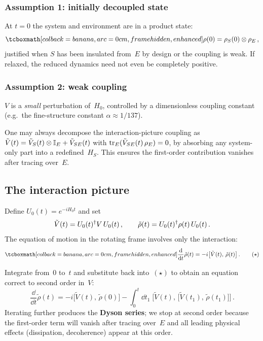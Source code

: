 \subsubsection{Assumption 1: initially decoupled state}

At $t=0$ the system and environment are in a product state:
\begin{equation}\label{eq:product-init}
  \eqbox{\rho(0) = \rho_S(0) \tp \rho_E}\,,
\end{equation}
justified when $S$ has been insulated from~$E$ by design or the
coupling is weak.  If relaxed, the reduced dynamics need not even be
completely positive.

\subsubsection{Assumption 2: weak coupling}

$V$ is a \emph{small} perturbation of~$H_0$, controlled by a
dimensionless coupling constant (e.g.\ the fine-structure constant
$\alpha\approx 1/137$).

\begin{remark}
  One may always decompose the interaction-picture coupling as
  $\tilde{V}(t) = \tilde{V}_S(t)\otimes\mathbb{I}_E + \tilde{V}_{SE}(t)$
  with $\operatorname{tr}_E(\tilde{V}_{SE}(t)\,\rho_E)=0$, by absorbing any
  system-only part into a redefined~$H_S$.  This ensures the
  first-order contribution vanishes after tracing over~$E$.
\end{remark}

\subsection{The interaction picture}%
\label{sec:interaction-picture}

Define $U_0(t)=e^{-iH_0 t}$ and set
\begin{equation}\label{eq:int-picture}
  \tilde{V}(t) = U_0(t)^\dagger V\, U_0(t)\,,\qquad
  \tilde{\rho}(t) = U_0(t)^\dagger\rho(t)\, U_0(t)\,.
\end{equation}
The equation of motion in the rotating frame involves only the
interaction:
\begin{equation}\label{eq:von-neumann-int}
  \eqbox{\frac{\dd}{\dd t}\tilde{\rho}(t)
  = -i\bigl[\tilde{V}(t),\,\tilde{\rho}(t)\bigr]}\,.
  \tag{$\star$}
\end{equation}

Integrate from~$0$ to~$t$ and substitute back into~$(\star)$ to
obtain an equation correct to second order in~$V$:
\begin{equation}\label{eq:second-order}
  \frac{\dd}{\dd t}\tilde{\rho}(t)
  = -i\bigl[\tilde{V}(t),\,\tilde{\rho}(0)\bigr]
  - \int_0^{t}\!\dd t_1\;
    \bigl[\tilde{V}(t),\,
          \bigl[\tilde{V}(t_1),\,\tilde{\rho}(t_1)\bigr]\bigr]\,.
\end{equation}
Iterating further produces the \textbf{Dyson series}; we stop at
second order because the first-order term will vanish after tracing
over~$E$ and all leading physical effects (dissipation, decoherence)
appear at this order.

